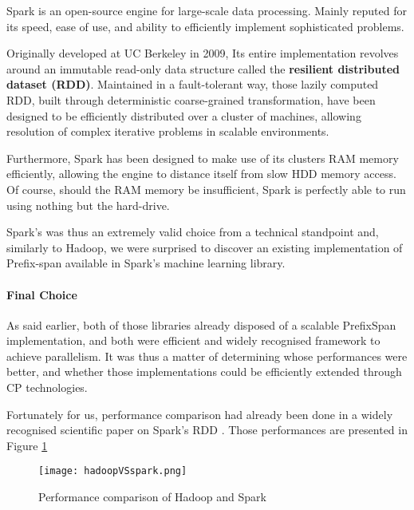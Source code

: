 \documentclass{eplmastersthesis}
\begin{document}
Spark is an open-source engine for large-scale data processing. Mainly reputed for its speed, ease of use, and ability to efficiently implement sophisticated problems. \newline

Originally developed at UC Berkeley in 2009, Its entire implementation revolves around an immutable read-only data structure called the \textbf{resilient distributed dataset (RDD)}. Maintained in a fault-tolerant way, those lazily computed RDD, built through deterministic coarse-grained transformation, have been designed to be efficiently distributed over a cluster of machines, allowing resolution of complex iterative problems in scalable environments. \newline

Furthermore, Spark has been designed to make use of its clusters RAM memory efficiently, allowing the engine to distance itself from slow HDD memory access. Of course, should the RAM memory be insufficient, Spark is perfectly able to run using nothing but the hard-drive. \newline

Spark's was thus an extremely valid choice from a technical standpoint and, similarly to Hadoop, we were surprised to discover an existing implementation of Prefix-span available in Spark's machine learning library.

\paragraph{Final Choice}

As said earlier, both of those libraries already disposed of a scalable PrefixSpan implementation, and both were efficient and widely recognised framework to achieve parallelism. It was thus a matter of determining whose performances were better, and whether those implementations could be efficiently extended through CP technologies. \newline

Fortunately for us, performance comparison had already been done in a widely recognised scientific paper on Spark's RDD \cite{zaharia2012resilient}. Those performances are presented in Figure \ref{fig:hadoopVSspark}

\begin{figure}[h]
  \centering
  \texttt{[image: hadoopVSspark.png]}
  \caption{Performance comparison of Hadoop and Spark}
  \label{fig:hadoopVSspark}
\end{figure}
\end{document}
